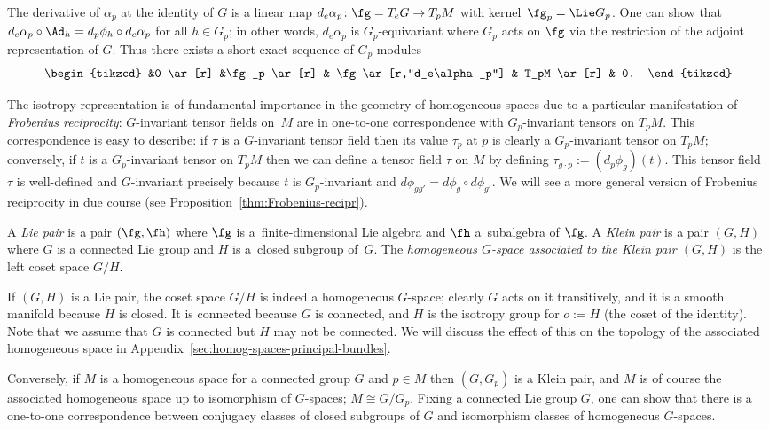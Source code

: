 The derivative of $\alpha_p$ at the identity of $G$ is a linear map $d_e\alpha_p\colon \fg=T_eG\to T_pM$ with kernel~${\fg_p=\Lie G_p}$. One can show that $d_e\alpha_p\circ\Ad_h=d_p\phi_h\circ d_e\alpha_p$ for all $h\in G_p$; in other words, $d_e\alpha_p$ is $G_p$-equivariant where $G_p$ acts on $\fg$ via the restriction of the adjoint representation of $G$. Thus there exists a short exact sequence of $G_p$-modules
\[
\begin{tikzcd}
	&0 \ar[r] &\fg_p \ar[r] & \fg \ar[r,"d_e\alpha_p"] & T_pM \ar[r] & 0.
\end{tikzcd}
\]

The isotropy representation is of fundamental importance in the geometry of homogeneous spaces due to a particular manifestation of \emph{Frobenius reciprocity}: $G$-invariant tensor fields on~$M$ are in one-to-one correspondence with $G_p$-invariant tensors on $T_p M$. This correspondence is easy to describe: if $\tau$ is a $G$-invariant tensor field then its value $\tau_p$ at $p$ is clearly a $G_p$-invariant tensor on $T_p M$; conversely, if $t$ is a $G_p$-invariant tensor on $T_p M$ then we can define a tensor field $\tau$ on $M$ by defining $\tau_{g\cdot p}:=(d_p\phi_{g})(t)$. This tensor field $\tau$ is well-defined and $G$-invariant precisely because $t$ is $G_p$-invariant and $d\phi_{gg'}=d\phi_g\circ d\phi_{g'}$. We will see a more general version of Frobenius reciprocity in due course (see Proposition~\ref{thm:Frobenius-recipr}).

\begin{Definition}\label{def:lie-pair-algs}
	A \emph{Lie pair} is a pair $(\fg,\fh)$ where $\fg$ is a~finite-dimensional Lie algebra and $\fh$ a~subalgebra of $\fg$.
	A \emph{Klein pair} is a pair $(G,H)$ where $G$ is a connected Lie group and $H$ is a~closed subgroup of~$G$.
	The \emph{homogeneous $G$-space associated to the Klein pair $(G,H)$} is the left coset space $G/H$.
\end{Definition}

If $(G,H)$ is a Lie pair, the coset space $G/H$ is indeed a homogeneous $G$-space; clearly $G$ acts on it transitively, and it is a smooth manifold because $H$ is closed. It is connected because $G$ is connected, and $H$ is the isotropy group for $o:=H$ (the coset of the identity). Note that we assume that $G$ is connected but $H$ may not be connected. We will discuss the effect of this on the topology of the associated homogeneous space in Appendix~\ref{sec:homog-spaces-principal-bundles}.

Conversely, if $M$ is a homogeneous space for a connected group $G$ and $p\in M$ then $(G,G_p)$ is a Klein pair, and $M$ is of course the associated homogeneous space up to isomorphism of $G$-spaces; $M\cong G/G_p$. Fixing a connected Lie group $G$, one can show that there is a one-to-one correspondence between conjugacy classes of closed subgroups of $G$ and isomorphism classes of homogeneous $G$-spaces.

